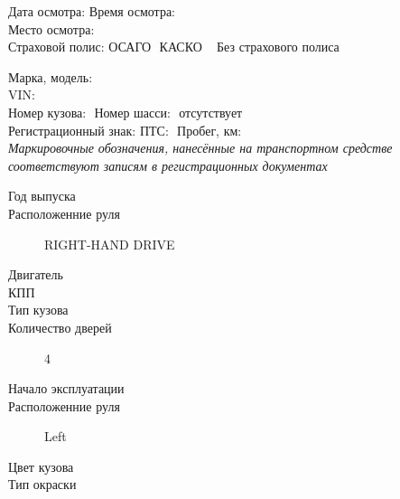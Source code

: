 \documentclass[a4paper,10pt]{report}
\def\двери{4}
\def\полис{Без страхового полиса  {\large \чекг}}
\def\руль{RIGHT-HAND DRIVE}
\begin{document}
\vspace{2mm}
\noindent Дата осмотра: \osm \hfill Время осмотра:\tm  \\
\noindent Место осмотра: \,\, \\
\noindent Страховой полис: ОСАГО {\large {}}\,\,КАСКО {\large {}}\,\,\, \polis \полис\\
\vspace{-2mm}
\begin{tcolorbox}[title=\textsl{Сведения о транспортном средстве},leftrule=0pt,rightrule=0pt,toprule=0pt,titlerule=0pt,sharp corners,
	colback=white,colframe=white,coltitle=black,colbacktitle=YellowOrange]
\end{tcolorbox}
\vspace{-5mm}
\noindent Марка, модель:\,\, \\
\noindent VIN:\,\,\,\underline{{\large{\textbf{\vin}}}} \\  
\noindent Номер кузова:\,\,{\vin} \hfill Номер шасси:\,\, отсутствует\\  
Регистрационный знак:\,\,\grz \hfill ПТС:\,\,  \hfill Пробег, км:\,\,\\
\textsl{\color{blue}Маркировочные обозначения, нанесённые на транспортном средстве  соответствуют  записям в регистрационных документах}\\
\noindent\parbox[l][5mm]{70mm}
{\begin{description}
			\item[Год выпуска] \hfill {}
			\item[Расположенние руля] \hfill \руль
			\item[Двигатель] \hfill {}
			\item[КПП] \hfill {}
			\item[Тип кузова] \hfill  {}
			\item[Количество дверей] \hfill \двери 
		\end{description}
	}   %
\hfill
\parbox[l][5mm]{70mm}{  
		\begin{description}
			\item[Начало эксплуатации] \hfill {}
			\item[Расположенние руля] \hfill Left
			\item[Цвет кузова] \hfill  {}
			\item[Тип окраски] \hfill {}
					\end{description}
}\\
\vspace{15mm}
\end{document}
